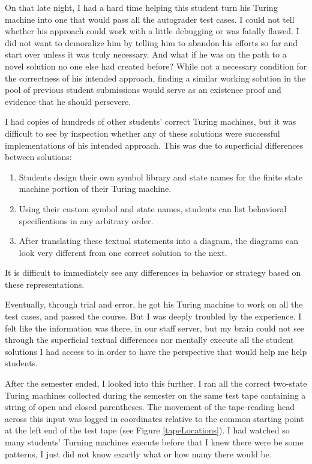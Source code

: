 On that late night, I had a hard time helping this student turn his Turing machine into one that would pass all the autograder test cases. I could not tell whether his approach could work with a little debugging or was fatally flawed. I did not want to demoralize him by telling him to abandon his efforts so far and start over unless it was truly necessary. And what if he was on the path to a novel solution no one else had created before? While not a necessary condition for the correctness of his intended approach, finding a similar working solution in the pool of previous student submissions would serve as an existence proof and evidence that he should persevere. 

I had copies of hundreds of other students' correct Turing machines, but it was difficult to see by inspection whether any of these solutions were successful implementations of his intended approach. This was due to superficial differences between solutions: 
\begin{enumerate}
\item Students design their own symbol library and state names for the finite state machine portion of their Turing machine. 
\item Using their custom symbol and state names, students can list behavioral specifications in any arbitrary order. 
\item After translating these textual statements into a diagram, the diagrams can look very different from one correct solution to the next. 
\end{enumerate}
It is difficult to immediately see any differences in behavior or strategy based on these representations.

Eventually, through trial and error, he got his Turing machine to work on all the test cases, and passed the course. But I was deeply troubled by the experience. I felt like the information was there, in our staff server, but my brain could not see through the superficial textual differences nor mentally execute all the student solutions I had access to in order to have the perspective that would help me help students.

After the semester ended, I looked into this further. I ran all the correct two-state Turing machines collected during the semester on the same test tape containing a string of open and closed parentheses. The movement of the tape-reading head across this input was logged in coordinates relative to the common starting point at the left end of the test tape (see Figure \ref{tapeLocations}). I had watched so many students' Turning machines execute before that I knew there were be some patterns, I just did not know exactly what or how many there would be.


